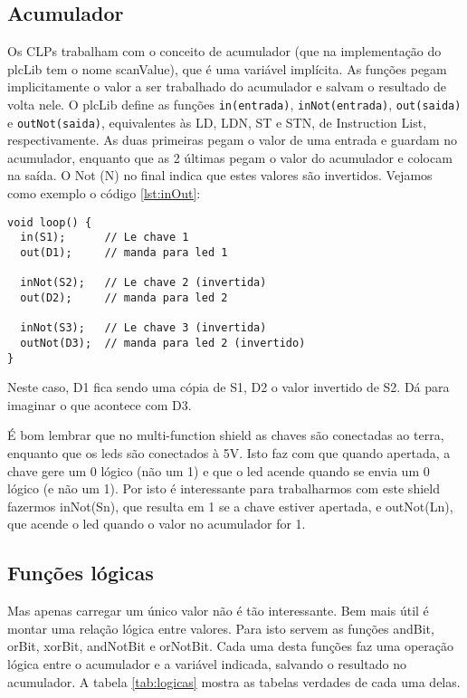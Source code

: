 \subsection{Acumulador}
Os CLPs trabalham com o conceito de acumulador (que na implementação do plcLib tem o nome scanValue), que é uma variável implícita. As funções pegam implicitamente o valor a ser trabalhado do acumulador e salvam o resultado de volta nele.
O plcLib define  as funções \lstinline|in(entrada)|, \lstinline|inNot(entrada)|, \lstinline|out(saida)| e \lstinline|outNot(saida)|, equivalentes às LD, LDN, ST e STN, de Instruction List, respectivamente. As duas primeiras pegam o valor de uma entrada e guardam no acumulador, enquanto que as 2 últimas pegam o valor do acumulador e colocam na saída. O Not (N) no final indica que estes valores são invertidos.
Vejamos como exemplo o código \ref{lst:inOut}:
\begin{lstlisting}[caption=Código simples de leitura de cópia de entradas para saídas., label=lst:inOut]
void loop() {
  in(S1);      // Le chave 1
  out(D1);     // manda para led 1

  inNot(S2);   // Le chave 2 (invertida)
  out(D2);     // manda para led 2
  
  inNot(S3);   // Le chave 3 (invertida)
  outNot(D3);  // manda para led 2 (invertido)
}
\end{lstlisting}

Neste caso, D1 fica sendo uma cópia de S1, D2 o valor invertido de S2. Dá para imaginar o que acontece com D3.

É bom lembrar que no multi-function shield as chaves são conectadas ao terra, enquanto que os leds são conectados à 5V. Isto faz com que quando apertada, a chave gere um 0 lógico (não um 1) e que o led acende quando se envia um 0 lógico (e não um 1). Por isto é interessante para trabalharmos com este shield fazermos inNot(Sn), que resulta em 1 se a chave estiver apertada, e outNot(Ln), que acende o led quando o valor no acumulador for 1.

\subsection{Funções lógicas}
Mas apenas carregar um único valor não é tão interessante. Bem mais útil é montar uma relação lógica entre valores. Para isto servem as funções andBit, orBit, xorBit, andNotBit e orNotBit. Cada uma desta funções faz uma operação lógica entre o acumulador e a variável indicada, salvando o resultado no acumulador. A tabela \ref{tab:logicas} mostra as tabelas verdades de cada uma delas.

